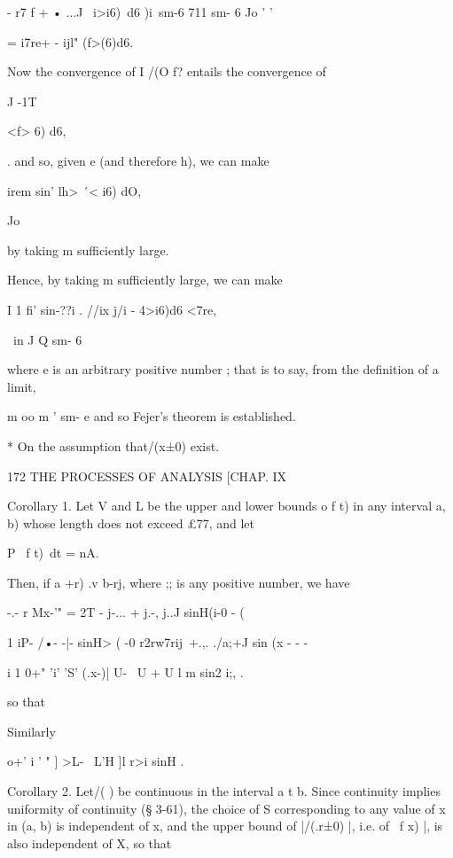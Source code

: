  - r7 f + • ...J \ i>i6)\ d6 )i\ sm-6 711 sm- 6 Jo ' '

= i7re+ - ijl" (f>(6)d6.



Now the convergence of I /(O f? entails the convergence of

J -1T



<f> 6) d6,

. and so, given e (and therefore h), we can make

 irem sin' lh> \'\ < i6) dO,

Jo

by taking m sufficiently large.

Hence, by taking m sufficiently large, we can make

I 1 fi' sin-??i . //ix j/i - 4>i6)d6 <7re,

\ in J Q sm- 6

where e is an arbitrary positive number ; that is to say, from the
definition of a limit,

m oo m ' sm- e and so Fejer's theorem is established.

* On the assumption that/(x±0) exist.



172 THE PROCESSES OF ANALYSIS [CHAP. IX

Corollary 1. Let V and L be the upper and lower bounds o f t) in any
interval a, b) whose length does not exceed £77, and let

P \ f t)\ dt = nA.

Then, if a +r) .v b-rj, where ;; is any positive number, we have

 -.- r Mx-'" = 2T - j-... + j.-, j..J sinH(i-0 - (

  1 iP- /•- -|- sinH> ( -0 r2rw7rij\ +.,. ./a;+J sin (x - - -

i 1 0+" 'i' 'S' (.x-)| U- \ U + U l m sin2 i;, .



so that



Similarly



    o+' i ' " ] >L- \ L'H ]l r>i sinH .



Corollary 2. Let/( ) be continuous in the interval a t b. Since
continuity implies uniformity of continuity (§ 3-61), the choice of S
corresponding to any value of x in (a, b) is independent of x, and the
upper bound of |/(.r±0) |, i.e. of \ f x) |, is also independent of X,
so that



